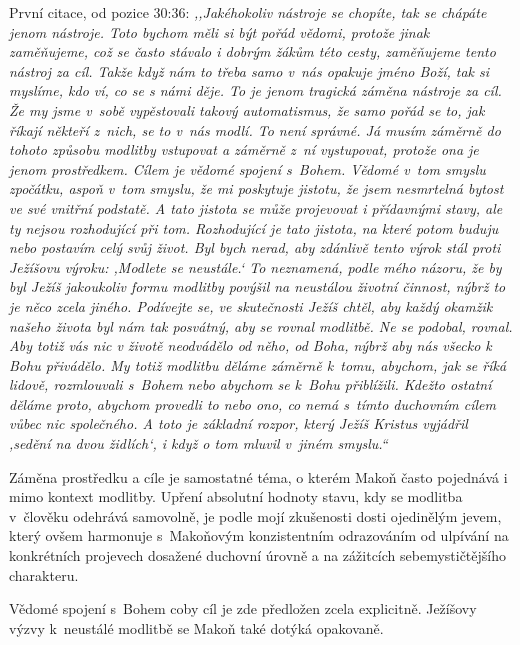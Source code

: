 \begin{enumerate}
{    První citace, od pozice 30:36: \textit{%
      ,,Jakéhokoliv nástroje se chopíte, tak se chápáte jenom nástroje. Toto
      bychom měli si být pořád vědomi, protože jinak zaměňujeme, což se často
      stávalo i dobrým žákům této cesty, zaměňujeme tento nástroj za cíl. Takže
      když nám to třeba samo v~nás opakuje jméno Boží, tak si myslíme, kdo ví,
      co se s námi děje. To je jenom tragická záměna nástroje za cíl. Že my jsme
      v~sobě vypěstovali takový automatismus, že samo pořád se to, jak říkají
      někteří z~nich, se to v~nás modlí. To není správné. Já musím záměrně do
      tohoto způsobu modlitby vstupovat a záměrně z~ní vystupovat, protože ona
      je jenom prostředkem. Cílem je vědomé spojení s~Bohem. Vědomé v~tom smyslu
      zpočátku, aspoň v~tom smyslu, že mi poskytuje jistotu, že jsem nesmrtelná
      bytost ve své vnitřní podstatě. A tato jistota se může projevovat i
      přídavnými stavy, ale ty nejsou rozhodující při tom. Rozhodující je tato
      jistota, na které potom buduju nebo postavím celý svůj život. Byl bych
      nerad, aby zdánlivě tento výrok stál proti Ježíšovu výroku: ,Modlete se
      neustále.` To neznamená, podle mého názoru, že by byl Ježíš jakoukoliv
      formu modlitby povýšil na neustálou životní činnost, nýbrž to je něco
      zcela jiného. Podívejte se, ve skutečnosti Ježíš chtěl, aby každý okamžik
      našeho života byl nám tak posvátný, aby se rovnal modlitbě. Ne se podobal,
      rovnal. Aby totiž vás nic v životě neodvádělo od něho, od Boha, nýbrž aby
      nás všecko k Bohu přivádělo. My totiž modlitbu děláme záměrně k~tomu,
      abychom, jak se říká lidově, rozmlouvali s~Bohem nebo abychom se k~Bohu
      přiblížili. Kdežto ostatní děláme proto, abychom provedli to nebo ono, co
      nemá s~tímto duchovním cílem vůbec nic společného. A toto je základní
      rozpor, který Ježíš Kristus vyjádřil ,sedění na dvou židlích`, i když o
      tom mluvil v~jiném smyslu.``
    }

    Záměna prostředku a cíle je samostatné téma, o kterém Makoň často pojednává
    i mimo kontext modlitby. Upření absolutní hodnoty stavu, kdy se modlitba
    v~člověku odehrává samovolně, je podle mojí zkušenosti dosti ojedinělým
    jevem, který ovšem harmonuje s~Makoňovým konzistentním odrazováním od
    ulpívání na konkrétních projevech dosažené duchovní úrovně a na zážitcích
    sebemystičtějšího charakteru.

    Vědomé spojení s~Bohem coby cíl je zde předložen zcela explicitně.
    Ježíšovy výzvy k~neustálé modlitbě se Makoň také dotýká opakovaně.

}
\end{enumerate}
